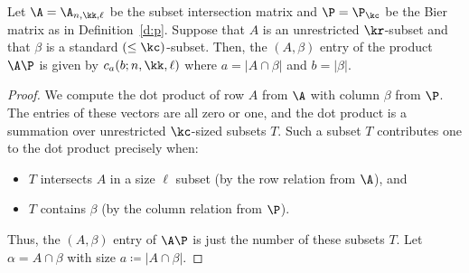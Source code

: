 \begin{lemma}\label{l:ap_entries}
Let $\A = \A_{n,\kk,\ell}$ be the subset intersection matrix and $\P = \P_{\kc}$ be the Bier
matrix as in Definition~\ref{d:p}.  Suppose that $A$ is an unrestricted
$\kr$-subset and that $\beta$ is a standard $(\leq \kc)$-subset.  Then, the $(A,
\beta)$ entry of the product $\A\P$ is given by $c_a(b; n, \kk, \ell)$ where $a = |A
\cap \beta|$ and $b = |\beta|$.
\end{lemma}
\begin{proof}
We compute the dot product of row $A$ from $\A$ with column $\beta$ from $\P$.  The entries of these vectors are all zero or one, and the dot product is a summation over unrestricted $\kc$-sized subsets $T$.  Such a subset $T$ contributes one to the dot product precisely when:
\begin{itemize}
    \item $T$ intersects $A$ in a size $\ell$ subset (by the row relation from $\A$), and
    \item $T$ contains $\beta$ (by the column relation from $\P$).
\end{itemize}
Thus, the $(A, \beta)$ entry of $\A \P$ is just the number of these subsets $T$.  Let $\alpha = A \cap \beta$ with size $a \coloneqq  |A \cap \beta|$.  


\end{proof}

